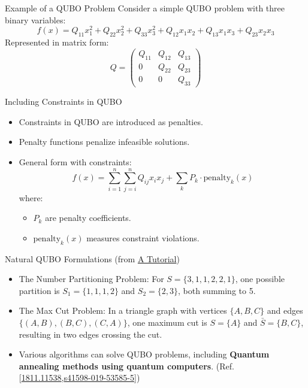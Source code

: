 \documentclass{beamer}
\begin{document}
	\begin{frame}[fragile]{Example of a QUBO Problem}
		Consider a simple QUBO problem with three binary variables:
		\[
		f(x) = Q_{11} x_1^2 + Q_{22} x_2^2 + Q_{33} x_3^2 + Q_{12} x_1 x_2 +Q_{13} x_1 x_3 + Q_{23} x_2 x_3
		\]
		Represented in matrix form:
		\[
		Q = \begin{pmatrix}
			Q_{11} & Q_{12} & Q_{13} \\
			0 & Q_{22} & Q_{23} \\
			0 & 0 & Q_{33}
		\end{pmatrix}
		\]
	\end{frame}
	\begin{frame}{Including Constraints in QUBO}
		\begin{itemize}
			\item Constraints in QUBO are introduced as penalties.
			\item Penalty functions penalize infeasible solutions.
			\item General form with constraints:
			\[
			f(x) = \sum_{i=1}^n \sum_{j=i}^n Q_{ij} x_i x_j + \sum_{k} P_k \cdot \text{penalty}_k(x)
			\]
			where:
			\begin{itemize}
				\item \(P_k\) are penalty coefficients.
				\item \(\text{penalty}_k(x)\) measures constraint violations.
			\end{itemize}
		\end{itemize}
	\end{frame}
	\begin{frame}{Natural QUBO Formulations (from \href{https://optimization-online.org/wp-content/uploads/2019/01/7014.pdf}{A Tutorial})}
		\begin{itemize}
			\item The Number Partitioning Problem: For \( S = \{3, 1, 1, 2, 2, 1\} \), one possible partition is \( S_1 = \{1, 1, 1, 2\} \) and \( S_2 = \{2, 3\} \), both summing to 5.
			
			\item The Max Cut Problem: In a triangle graph with vertices \( \{A, B, C\} \) and edges \( \{(A, B), (B, C), (C, A)\} \), one maximum cut is \( S = \{A\} \) and \( \bar{S} = \{B, C\} \), resulting in two edges crossing the cut.
		\end{itemize}
		\begin{itemize}
			\item Various algorithms can solve QUBO problems, including \textbf{Quantum annealing methods using quantum computers}. (Ref. [\href{https://arxiv.org/pdf/1811.11538}{1811.11538},\href{https://www.nature.com/articles/s41598-019-53585-5}{s41598-019-53585-5}])
		\end{itemize}
	\end{frame}
	
\end{document}
